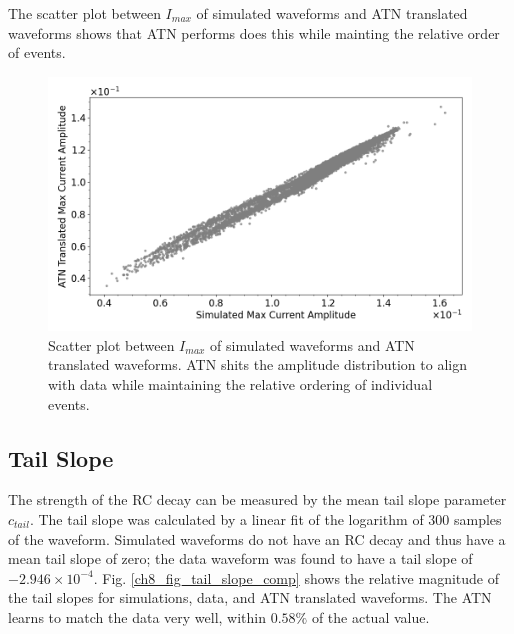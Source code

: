 The scatter plot between $I_{max}$ of simulated waveforms and ATN translated waveforms shows that ATN performs does this while mainting the relative order of events.

\begin{figure}[htb!]
\centering
\includegraphics[width=0.99\linewidth,trim={0pc 0pc 0pc 0pc},clip]{ch8/figs/SEP_scatter_current_amplitude.png}
\caption{Scatter plot between $I_{max}$ of simulated waveforms and ATN translated waveforms. ATN shits the amplitude distribution to align with data while maintaining the relative ordering of individual events.}
\label{fig:current_amp}
\end{figure}



\subsection{Tail Slope}
The strength of the RC decay can be measured by the mean tail slope parameter $c_{tail}$. The tail slope was calculated by a linear fit of the logarithm of 300 samples of the waveform. Simulated waveforms do not have an RC decay and thus have a mean tail slope of zero; the data waveform was found to have a tail slope of $-2.946\times10^{-4}$.  Fig. \ref{ch8_fig_tail_slope_comp} shows the relative magnitude of the tail slopes for simulations, data, and ATN translated waveforms. The ATN learns to match the data very well, within $0.58\%$ of the actual value.


